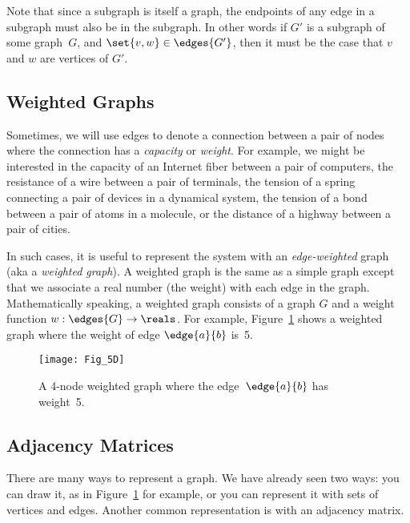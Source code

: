 Note that since a subgraph is itself a graph, the endpoints of any edge in
a subgraph must also be in the subgraph.  In other words if $G'$ is a
subgraph of some graph~$G$, and $\set{ v, w } \in \edges{G'}$, then it
must be the case that $v$ and $w$ are vertices of $G'$.

\subsection{Weighted Graphs}

Sometimes, we will use edges to denote a connection between a pair of
nodes where the connection has a \emph{capacity} or \emph{weight}.
For example, we might be interested in the capacity of an Internet
fiber between a pair of computers, the resistance of a wire between a
pair of terminals, the tension of a spring connecting a pair of
devices in a dynamical system, the tension of a bond between a pair of
atoms in a molecule, or the distance of a highway between a pair of
cities.

In such cases, it is useful to represent the system with an
\emph{edge-weighted} graph (aka a \emph{weighted graph}).  A weighted
graph is the same as a simple graph except that we associate a real
number (\ie the weight) with each edge in the graph.  Mathematically
speaking, a weighted graph consists of a graph $G$ and a
weight function $w: \edges{G} \to \reals$.  For example,
Figure~\ref{fig:weighted_graph} shows a weighted graph where the
weight of edge $\edge{a}{b}$ is~5.

\begin{figure}\redrawn

\texttt{[image: Fig\_5D]}

\caption{A 4-node weighted graph where the edge~$\edge{a}{b}$ has
  weight~5.}
\label{fig:weighted_graph}
\end{figure}

\subsection{Adjacency Matrices}

There are many ways to represent a graph.  We have already seen two ways:
you can draw it, as in Figure~\ref{fig:weighted_graph} for example, or you
can represent it with sets of vertices and edges.  Another common
representation is with an adjacency matrix.

